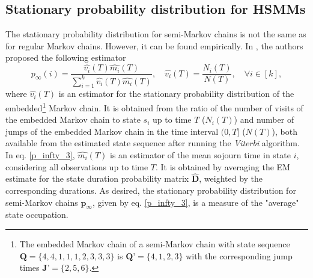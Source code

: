 \documentclass[extendedabs]{recpad2k}
\begin{document}
\subsection{Stationary probability distribution for HSMMs}
The stationary probability distribution for semi-Markov chains is not the same as for regular Markov chains. However, it can be found empirically. In \cite{barbu2012estimation}, the authors proposed the following estimator
\begin{equation}
    p_\infty(i) = \dfrac{\hat{v_i}(T) \hat{m_i}(T)}{\sum_{i=1}^k  \hat{v_i}(T) \hat{m_i}(T) }, \quad \hat{v_i}(T) = \dfrac{N_i(T)}{N(T)}, \quad \forall i \in [k],
    \label{p_infty_3}
\end{equation}
where $\hat{v_i}(T)$ is an estimator for the stationary probability distribution of the embedded\footnote{The embedded Markov chain of a semi-Markov chain with state sequence $\textbf{Q}=\{4,4,1,1,1,2,3,3,3\}$ is $\textbf{Q'}=\{4,1,2,3\}$ with the corresponding jump times $\textbf{J'}=\{2,5,6\}.$} Markov chain. 
It is obtained from the ratio of the number of visits of the embedded Markov chain to state $s_i$ up to time $T$ ($N_i(T)$) and number of jumps of the embedded Markov chain in the time interval $(0,T]$ ($N(T)$), both available from the estimated state sequence after running the \textit{Viterbi} algorithm. In eq. \eqref{p_infty_3},  $\hat{m_i}(T)$ is an estimator of the mean sojourn time in state $i$, considering all observations up to time $T$. It is obtained by averaging the EM estimate for the state duration probability matrix $\hat{\boldsymbol{D}}$, weighted by the corresponding durations. As desired, the stationary probability distribution for semi-Markov chains $\boldsymbol{p}_\infty$, given by eq. \eqref{p_infty_3}, is a measure of the "average" state occupation.
\end{document}
